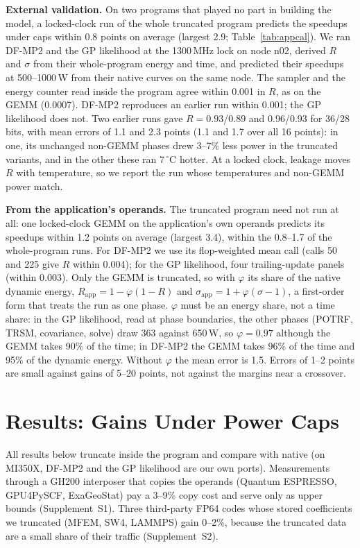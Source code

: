 \documentclass[conference]{IEEEtran}
\newcommand{\W}{\,W}
\newcommand{\pct}{\%}
\begin{document}
\textbf{External validation.} On two programs that played no part in building the model, a locked-clock run of the
whole truncated program predicts the speedups under caps within 0.8 points on average (largest 2.9;
Table~\ref{tab:appcal}). We ran DF-MP2 and the GP likelihood at the 1300\,MHz lock on node n02, derived $R$ and $\sigma$
from their whole-program energy and time, and predicted their speedups at 500--1000\W{} from their native curves on the
same node. The sampler and the energy counter read inside the program agree within 0.001 in $R$, as on the GEMM
(0.0007). DF-MP2 reproduces an earlier run within 0.001; the GP likelihood does not. Two earlier runs gave $R=0.93$/0.89
and 0.96/0.93 for 36/28 bits, with mean errors of 1.1 and 2.3 points (1.1 and 1.7 over all 16 points): in one, its
unchanged non-GEMM phases drew 3--7\pct{} less power in the truncated variants, and in the other these ran 7\,$^\circ$C
hotter. At a locked clock, leakage moves $R$ with temperature, so we report the run whose temperatures and non-GEMM power
match.

\textbf{From the application's operands.} The truncated program need not run at all: one locked-clock GEMM on the
application's own operands predicts its speedups within 1.2 points on average (largest 3.4), within the 0.8--1.7 of the
whole-program runs. For DF-MP2 we use its flop-weighted mean call (calls 50 and 225 give $R$ within 0.004); for the GP
likelihood, four trailing-update panels (within 0.003). Only the GEMM is truncated, so with $\varphi$ its share of the
native dynamic energy, $R_\mathrm{app}=1-\varphi(1-R)$ and $\sigma_\mathrm{app}=1+\varphi(\sigma-1)$, a first-order form
that treats the run as one phase. $\varphi$ must be an energy share, not a time share: in the GP likelihood, read at
phase boundaries, the other phases (POTRF, TRSM, covariance, solve) draw 363 against 650\W, so $\varphi=0.97$ although
the GEMM takes 90\pct{} of the time; in DF-MP2 the GEMM takes 96\pct{} of the time and 95\pct{} of the dynamic energy.
Without $\varphi$ the mean error is 1.5. Errors of 1--2 points are small against gains of 5--20 points, not against the
margins near a crossover.

\section{Results: Gains Under Power Caps}\label{sec:results}

All results below truncate inside the program and compare with native (on MI350X, DF-MP2 and the GP likelihood
are our own ports). Measurements through a GH200 interposer
that copies the operands (Quantum ESPRESSO, GPU4PySCF, ExaGeoStat) pay a 3--9\pct{} copy cost and serve only as upper
bounds (Supplement~S1). Three third-party FP64 codes whose stored
coefficients we truncated (MFEM, SW4, LAMMPS) gain 0--2\pct, because the truncated data are a small share of their traffic
(Supplement~S2).
\end{document}
